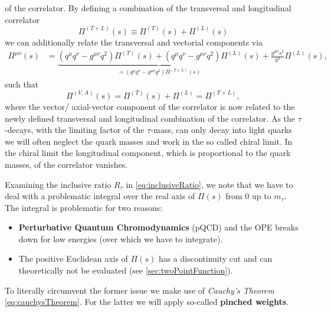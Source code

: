\documentclass[../../index.tex]{subfiles}
\begin{document}
of the correlator. By defining a combination of the transversal and longitudinal
correlator
\begin{equation}
  \label{eq:correlatorCombination}
  \Pi^{(T+L)}(s) \equiv \Pi^{(T)}(s) + \Pi^{(L)}(s)
\end{equation}
we can additionally relate the transversal and vectorial components via
\begin{equation}
  \label{eq:longitudinalCorrelator}
  \begin{split}
    \Pi^{\mu\nu}(s) &= \underbrace{(q^\mu q^\nu - g^{\mu\nu}q^2)\Pi^{(T)}(s) + (q^\mu q^\nu - g^{\mu\nu} q^2)\Pi^{(L)}(s)}_{=(q^\mu q^\nu - g^{\mu\nu} q^2) \Pi^{(T+L)}(s)} + \frac{g^{\mu\nu}s^2}{q^2}\Pi^{(L)}(s),
  \end{split} 
\end{equation}
such that
\begin{equation}
  \Pi^{(V,A)}(s) = \Pi^{(T)}(s) + \Pi^{(L)} = \Pi^{(T+L)},
\end{equation}
where the vector/ axial-vector component of the correlator is now related to the
newly defined transversal and longitudinal combination of the correlator. As the
$\tau$-decays, with the limiting factor of the $\tau$-mass, can only decay into
light quarks we will often neglect the quark masses and work in the so called
chiral limit. In the chiral limit the longitudinal component, which is 
proportional to the quark masses, of the correlator vanishes.  

Examining the inclusive ratio $R_\tau$ in \cref{eq:inclusiveRatio}, we note that
we have to deal with a problematic integral over the real axis of $\Pi(s)$ from
$0$ up to $m_\tau$. The integral is problematic for two reasons:
\begin{itemize}
  \item \textbf{Perturbative Quantum Chromodynamics} (pQCD) and the OPE breaks down for low
    energies (over which we have to integrate).
  \item The positive Euclidean axis of $\Pi(s)$ has a discontinuity cut and can
    theoretically not be evaluated (see \cref{sec:twoPointFunction}).
\end{itemize}
To literally circumvent the former issue we make use of \textit{Cauchy's Theorem}
\cref{eq:cauchysTheorem}. For the latter we will apply so-called \textbf{pinched weights}.
\end{document}
